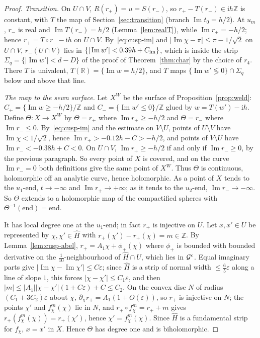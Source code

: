 \documentclass[11pt]{amsart}
\theoremstyle{definition}
\newcommand{\Rr}{R}
\newcommand{\ii}{\mathrm{i}}
\begin{document}
\begin{proof}
\emph{Transition.}  On $U\cap V$, $\Rr(r_+)=u=S(r_-)$, so $r_+-T(r_-)\in\ii h\mathbb Z$ is
constant, with $T$ the map of Section~\ref{sec:transition} (branch
$\operatorname{Im}t_0=h/2$).  At $u_m$, $r_-$ is real and $\operatorname{Im}T(r_-)=h/2$
(Lemma~\ref{lem:realT}), while $\operatorname{Im}r_+=-h/2$; hence $r_+=T\circ r_--\ii h$ on $U\cap V$.
By~\eqref{eq:cusp-im} and $|\operatorname{Im}\chi-\pi|\le\pi-1/\sqrt2$ on $U\cap V$, $r_-(U\cap V)$
lies in $\{|\operatorname{Im}w'|<0.39h+C_{\rm im}\}$, which is inside the strip
$\Sigma_q=\{|\operatorname{Im}w'|<d-D\}$ of the proof of Theorem~\ref{thm:char} by the choice of
$r_4$.  There $T$ is univalent, $T(\mathbb R)=\{\operatorname{Im}w=h/2\}$, and $T$ maps
$\{\operatorname{Im}w'\lessgtr0\}\cap\Sigma_q$ below and above that line.

\emph{The map to the sewn surface.}  Let $X^W$ be the surface of
Proposition~\ref{prop:weld}: $C_+=\{\operatorname{Im}w\ge-h/2\}/\mathbb Z$ and
$C_-=\{\operatorname{Im}w'\le0\}/\mathbb Z$ glued by $w=T(w')-\ii h$.  Define $\Theta:X\to X^W$
by $\Theta=r_+$ where $\operatorname{Im}r_+\ge-h/2$ and $\Theta=r_-$ where $\operatorname{Im}r_-\le0$.
By~\eqref{eq:cusp-im} and the estimate on $V\setminus U$, points of $U\setminus V$ have
$\operatorname{Im}\chi<1/\sqrt2$, hence $\operatorname{Im}r_+>-0.12h-C>-h/2$, and points of $V\setminus U$ have
$\operatorname{Im}r_-<-0.38h+C<0$.  On $U\cap V$, $\operatorname{Im}r_+\ge-h/2$ if and only if
$\operatorname{Im}r_-\ge0$, by the previous paragraph.  So every point of $X$ is covered, and
on the curve $\operatorname{Im}r_-=0$ both definitions give the same point of $X^W$.  Thus $\Theta$
is continuous, holomorphic off an analytic curve, hence holomorphic.  As a
point of $X$ tends to the $u_1$-end, $t\to-\infty$ and $\operatorname{Im}r_+\to+\infty$; as it tends
to the $u_2$-end, $\operatorname{Im}r_-\to-\infty$.  So $\Theta$ extends to a holomorphic map of
the compactified spheres with $\Theta^{-1}(\text{end})=\text{end}$.

It has local degree one at the $u_1$-end; in fact $r_+$ is injective on $U$.
Let $x,x'\in U$ be represented by $\chi,\chi'\in\hat H$ with $r_+(\chi')-r_+(\chi)=m\in\mathbb Z$.  By
Lemma~\ref{lem:cusp-abel}, $r_+=A_1\chi+\phi_+(\chi)$ where $\phi_+$ is bounded with
bounded derivative on the $\tfrac1{10}$-neighbourhood of $\hat H\cap U$, which lies in
$\mathcal G^{\rm c}$.  Equal
imaginary parts give $|\operatorname{Im}\chi-\operatorname{Im}\chi'|\le C\varepsilon$; since $\hat H$ is a strip of normal
width $\le\tfrac65\varepsilon$ along a line of slope $1$, this forces $|\chi-\chi'|\le C_1\varepsilon$, and then
$|m|\le|A_1||\chi-\chi'|(1+C\varepsilon)+C\le C_2$.  On the convex disc $N$ of radius
$(C_1+3C_2)\varepsilon$ about $\chi$, $\partial_\chi r_+=A_1(1+O(\varepsilon))$, so $r_+$ is injective on $N$; the
points $\chi'$ and $f_\chi^m(\chi)$ lie in $N$, and $r_+\circ f_\chi^m=r_++m$ gives
$r_+(f_\chi^m(\chi))=r_+(\chi')$, hence $\chi'=f_\chi^m(\chi)$.  Since $\hat H$ is a fundamental strip
for $f_\chi$, $x=x'$ in $X$.  Hence $\Theta$ has degree one and is biholomorphic.


\end{proof}
\end{document}
